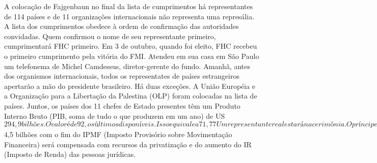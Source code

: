 A colocação de Fajgenbaun no final da lista de cumprimentos há representantes de 114 países e de 11 organizações internacionais não representa uma represália.
A lista dos cumprimentos obedece à ordem de confirmação das autoridades convidadas. Quem confirmou o nome de seu representante primeiro, cumprimentará FHC primeiro.
Em 3 de outubro, quando foi eleito, FHC recebeu o primeiro cumprimento pela vitória do FMI. Atendeu em sua casa em São Paulo um telefonema de Michel Camdessus, diretor-gerente do fundo.
Amanhã, antes dos organismos internacionais, todos os representates de países estrangeiros apertarão a mão do presidente brasileiro. Há duas exceções. A União Européia e a Organização para a Libertação da Palestina (OLP) foram colocadas na lista de países.
Juntos, os países dos 11 chefes de Estado presentes têm um Produto Interno Bruto (PIB, soma de tudo o que produzem em um ano) de US$ 294,9 bilhões. O valor é de 92, os últimos disponíveis. Isso equivale a 71,77%
Um representante real estará na cerimônia. O príncipe Abdul Aziz Althenaian Al-Saud representará a Arábia Saudita.
O Grupo dos Sete (G-7), que reúne os países mais ricos do planeta, enviou os seguintes representantes: Janet Reno (EUA, ministra da Justiça); Sheila Copps (Canadá, ministra do Meio Ambiente); Burkhard Hirsch (Alemanha, vice-presidente do Parlamento Federal); Vincenso Trantino (Itália, vice-ministro das Relações Exteriores); Michael Portillo (Grã-Bretanha, ministro do Trabalho); Simone Weil (França, ministra dos Assuntos Sociais, da Saúde e Urbanos) e Keizo Obuchi (Japão, deputado do Partido Liberal Democrático).
Dos representantes do G-7, FHC pretende conceder audiências separadas amanhã para Janet Reno, Keizo Obuchi e Simone Weil. Também deverá receber Narcís Serra Serra, vice-presidente do Governo da Espanha, e José Angel Gurría, secretário das Relações Exteriores do México.
</TEXT>
</DOC>
<DOC>
<DOCNO>FSP950101-159</DOCNO>
<DOCID>FSP950101-159</DOCID>
<DATE>950101</DATE>
<CATEGORY>CADERNO_ESPECIAL_-_ANOS_FHC</CATEGORY>
<TEXT>
LILIANA LAVORATTI;  VIVALDO DE SOUZA 
Da Sucursal de Brasília 
A principal preocupação da equipe econômica nos primeiros meses do próximo governo é aumentar a arrecadação e reduzir os gastos públicos para que o Plano Real deixe de se sustentar na política cambial, que deverá sofrer ajustes graduais.
O governo não pretende baixar nenhum pacote de medidas em janeiro, disse à Folha o novo ministro da Fazenda, Pedro Malan. FHC deve anunciar em janeiro regras para agilizar o programa de privatização.
As projeções feitas pela área econômica mostram que a perda de receita de R$ 4,5 bilhões com o fim do IPMF (Imposto Provisório sobre Movimentação Financeira) será compensada com recursos da privatização e do aumento do IR (Imposto de Renda) das pessoas jurídicas.
